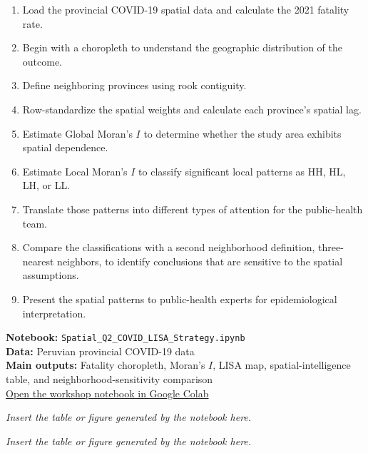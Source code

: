\documentclass[11pt]{article}
\newcommand{\colablink}{\href{https://colab.research.google.com/}{Open the workshop notebook in Google Colab}}
\newcommand{\outputplaceholder}[1]{%
\begin{tcolorbox}[
  colback=white,
  colframe=black!30,
  title=Colab output: #1,
  fonttitle=\bfseries
]
\centering
\vspace{1.2cm}
\textit{Insert the table or figure generated by the notebook here.}
\vspace{1.2cm}
\end{tcolorbox}
}
\begin{document}
\begin{enumerate}[leftmargin=*]

    \item Load the provincial COVID-19 spatial data and calculate the 2021 fatality rate.

    \item Begin with a choropleth to understand the geographic distribution of the outcome.

    \item Define neighboring provinces using rook contiguity.

    \item Row-standardize the spatial weights and calculate each province's spatial lag.

    \item Estimate Global Moran's \(I\) to determine whether the study area exhibits spatial dependence.

    \item Estimate Local Moran's \(I\) to classify significant local patterns as HH, HL, LH, or LL.

    \item Translate those patterns into different types of attention for the public-health team.

    \item Compare the classifications with a second neighborhood definition, three-nearest neighbors, to identify conclusions that are sensitive to the spatial assumptions.

    \item Present the spatial patterns to public-health experts for epidemiological interpretation.

\end{enumerate}

\begin{notebookbox}
\textbf{Notebook:} \texttt{Spatial\_Q2\_COVID\_LISA\_Strategy.ipynb}\\
\textbf{Data:} Peruvian provincial COVID-19 data\\
\textbf{Main outputs:} Fatality choropleth, Moran's \(I\), LISA map, spatial-intelligence table, and neighborhood-sensitivity comparison\\[0.5em]
\colablink
\end{notebookbox}

\outputplaceholder{Local spatial patterns of COVID-19 fatality}

\outputplaceholder{Province-level spatial-intelligence table}
\end{document}
